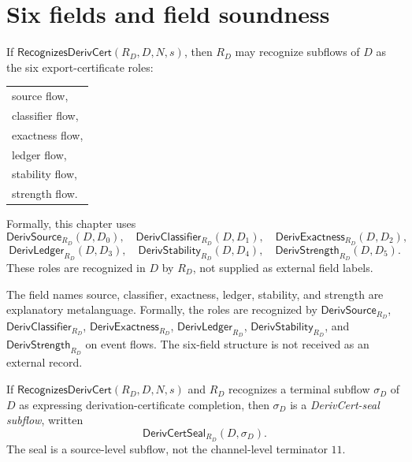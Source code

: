 \section{Six fields and field soundness}
\label{sec:derivcert-generated-fields-and-soundness}

\begin{definition}
\label{def:derivcert-generated-field-subflows}
If $\mathsf{RecognizesDerivCert}(R_D,D,N,s)$, then $R_D$ may recognize subflows of $D$ as the six export-certificate roles:
\begin{center}
\begin{tabular}{l}
  source flow, \\
  classifier flow, \\
  exactness flow, \\
  ledger flow, \\
  stability flow, \\
  strength flow.
\end{tabular}
\end{center}
Formally, this chapter uses
$$
  \mathsf{DerivSource}_{R_D}(D,D_0),\quad
  \mathsf{DerivClassifier}_{R_D}(D,D_1),\quad
  \mathsf{DerivExactness}_{R_D}(D,D_2),
$$
$$
  \mathsf{DerivLedger}_{R_D}(D,D_3),\quad
  \mathsf{DerivStability}_{R_D}(D,D_4),\quad
  \mathsf{DerivStrength}_{R_D}(D,D_5).
$$
These roles are recognized in $D$ by $R_D$, not supplied as external field labels.
\end{definition}

\begin{remark}
\label{rem:derivcert-generated-field-names-metalanguage}
The field names source, classifier, exactness, ledger, stability, and strength are explanatory metalanguage. Formally, the roles are recognized by $\mathsf{DerivSource}_{R_D}$, $\mathsf{DerivClassifier}_{R_D}$, $\mathsf{DerivExactness}_{R_D}$, $\mathsf{DerivLedger}_{R_D}$, $\mathsf{DerivStability}_{R_D}$, and $\mathsf{DerivStrength}_{R_D}$ on event flows. The six-field structure is not received as an external record.
\end{remark}

\begin{definition}
\label{def:derivcert-generated-seal-subflow}
If $\mathsf{RecognizesDerivCert}(R_D,D,N,s)$ and $R_D$ recognizes a terminal subflow $\sigma_D$ of $D$ as expressing derivation-certificate completion, then $\sigma_D$ is a \emph{DerivCert-seal subflow}, written
$$
  \mathsf{DerivCertSeal}_{R_D}(D,\sigma_D).
$$
The seal is a source-level subflow, not the channel-level terminator $11$.
\end{definition}

